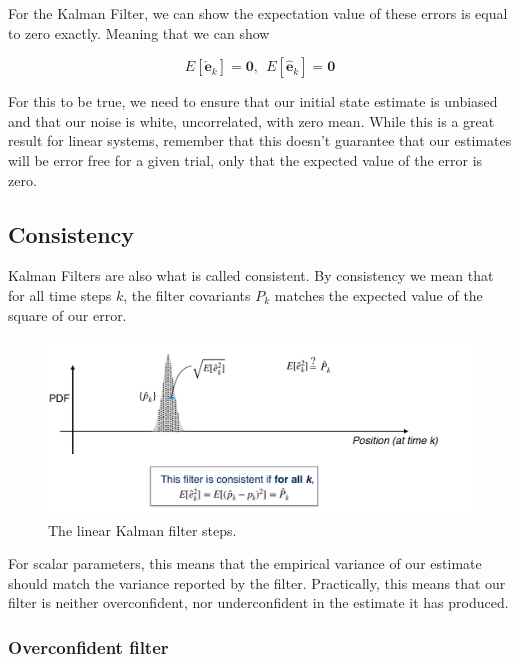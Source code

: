 For the Kalman Filter, we can show the expectation value of
these errors is equal to zero exactly. Meaning that we can show

\begin{equation}
E[\check{\mathbf{e}}_k] = \mathbf{0}, ~~ E[\hat{\mathbf{e}}_k] = \mathbf{0}
\end{equation}

For this to be true, we need to ensure that our initial state estimate is unbiased and that our noise is white,
uncorrelated, with zero mean. While this is a great result for linear systems, remember that this doesn't guarantee that
our estimates will be error free for a given trial, only that the expected
value of the error is zero. 

\subsection{Consistency}
\label{kalman_filter_consistency}

Kalman Filters are also what is called consistent. By consistency we mean that for
all time steps $k$, the filter covariants $P_k$ matches the expected
value of the square of our error. 

\begin{figure}[!htb]
\begin{center}
\includegraphics[scale=0.280]{img/kalman_filter/kalman_5.jpeg}
\end{center}
\caption{The linear Kalman filter steps.}
\label{kalman_5}
\end{figure}

For scalar parameters,
this means that the empirical variance of our estimate should match
the variance reported by the filter. Practically, this means that our
filter is neither overconfident, nor underconfident in
the estimate it has produced. 

\subsubsection{Overconfident filter}

